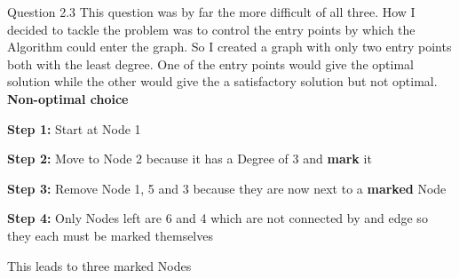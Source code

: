 \documentclass[11pt]{article}
\begin{document}
\pagebreak
\hfill \break
\break
Question 2.3
\hfill \break
\break
This question was by far the more difficult of all three. How I decided to tackle the problem was to control the entry points by which the Algorithm could enter the graph. So I created a graph with only two entry points both with the least degree. One of the entry points would give the optimal solution while the other would give the a satisfactory solution but not optimal.
\hfill \break
\break
\textbf{Non-optimal choice}
\begin{steps}
  \item \textbf{Step 1:} Start at Node 1
  \item \textbf{Step 2:} Move to Node 2 because it has a Degree of 3 and \textbf{mark} it
  \item \textbf{Step 3:} Remove Node 1, 5 and 3 because they are now next to a \textbf{marked} Node
  \item \textbf{Step 4:} Only Nodes left are 6 and 4 which are not connected by and edge so they each must be marked themselves
\end{steps}
\hfill \break
\break
This leads to three marked Nodes
\begin{center}

\end{center}
\noindent{}%
\hfill%
\end{document}
